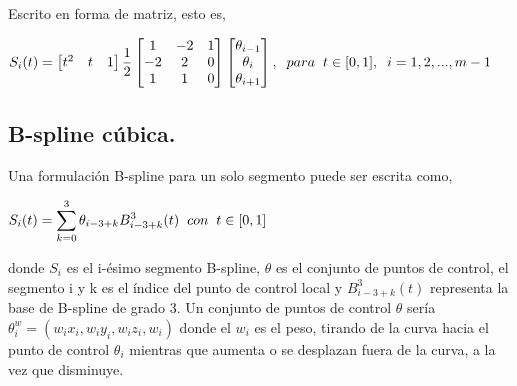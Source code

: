 \hspace{0.4cm} Escrito en forma de matriz, esto es,


\begin{center}
$\displaystyle{S_{i}(t) = \begin{bmatrix} t^2 & t & 1  \end{bmatrix} \frac{1}{2} \begin{bmatrix} 1 & -2 & 1\\ -2 & 2 & 0  \\ 1 & 1 & 0 \end{bmatrix} \begin{bmatrix}  \theta_{i-1} \\ \theta_{i} \\ \theta_{i+1}  \end{bmatrix} , \hspace{0.2cm} para \hspace{0.2cm} t \in [0,1],\hspace{0.2cm}  i=1,2,...,m-1 }$
\end{center}


\subsection{B-spline c\'ubica.\\}

\hspace{0.4cm} Una formulaci\'on B-spline para un solo segmento puede ser escrita como,

\begin{center}
$\displaystyle{S_{i}(t) = \sum_{k=0}^{3} \theta_{i-3+k} B_{i-3+k}^{3}(t) \hspace{0.2cm} con \hspace{0.2cm} t \in [0,1]  }$
\end{center}

\vspace{0.2cm}

\noindent donde $S_{i}$ es el i-\'esimo segmento B-spline, $\theta$ es el conjunto de puntos de control, el segmento i y k es el \'indice del punto de control local y $ B_{i-3+k}^{3}(t)$ representa la base de B-spline de grado 3. Un conjunto de puntos de control $\theta$ ser\'ia  ${\displaystyle \theta_{i}^{w}=(w_{i}x_{i},w_{i}y_{i},w_{i}z_{i},w_{i})}$ donde el ${\displaystyle w_{i}}$ es el peso, tirando de la curva hacia el punto de control ${\displaystyle \theta_{i}}$ mientras que aumenta o se desplazan fuera de la curva, a la vez que disminuye.

\newpage

